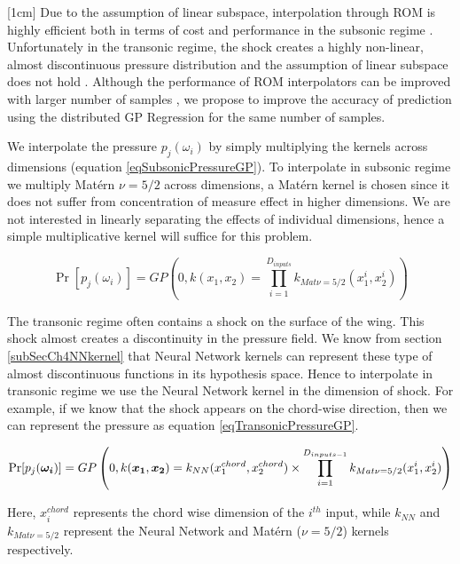 \begin{mdframed}[hidealllines=true,backgroundcolor=blue!20]
[1cm]
Due to the assumption of linear subspace, interpolation through ROM is highly efficient both in terms of cost and performance in the subsonic regime \cite{verveld2016reduced}. Unfortunately in the transonic regime, the shock creates a highly non-linear, almost discontinuous pressure distribution and the assumption of linear subspace does not hold \cite{li2016performance}. Although the performance of ROM interpolators can be improved with larger number of samples \cite{franz2014interpolation, forrester2008engineering}, we propose to improve the accuracy of prediction using the distributed GP Regression for the same number of samples.  

We interpolate the pressure $p_{j}(\omega_{i})$ by simply multiplying the kernels across dimensions (equation \ref{eqSubsonicPressureGP}). To interpolate in subsonic regime we multiply Mat\'ern $\nu=5/2$ across dimensions, a Mat\'ern kernel is chosen since it does not suffer from concentration of measure effect in higher dimensions. We are not interested in linearly separating the effects of individual dimensions, hence a simple multiplicative kernel will suffice for this problem. 

\begin{equation}\label{eqSubsonicPressureGP}
\Pr[p_{j}(\omega_{i})] = GP \left( 0, k(x_{1}, x_{2}) = \prod_{i=1}^{D_{inputs}} k_{Mat \nu =5/2}(x_{1}^{i}, x_{2}^{i}) \right)
\end{equation}

The transonic regime often contains a shock on the surface of the wing. This shock almost creates a discontinuity in the pressure field. We know from section \ref{subSecCh4NNkernel} that Neural Network kernels can represent these type of almost discontinuous functions in its hypothesis space. Hence to interpolate in transonic regime we use the Neural Network kernel in the dimension of shock. For example, if we know that the shock appears on the chord-wise direction, then we can represent the pressure as equation \ref{eqTransonicPressureGP}.

\begin{equation}\label{eqTransonicPressureGP}
\Pr[p_{j}(\boldsymbol{\omega_{i}})] = GP \left( 0, k(\boldsymbol{x_{1}}, \boldsymbol{x_{2}}) = k_{NN}(x_{1}^{chord}, x_{2}^{chord}) \times \prod_{i=1}^{D_{inputs-1}} k_{Mat \nu =5/2}(x_{1}^{i}, x_{2}^{i}) \right)
\end{equation}

Here, $x_i^{chord}$ represents the chord wise dimension of the $i^{th}$ input, while $k_{NN}$ and $k_{Mat \nu =5/2}$ represent the Neural Network and Mat\'ern ($\nu=5/2$) kernels respectively.
\end{mdframed}

